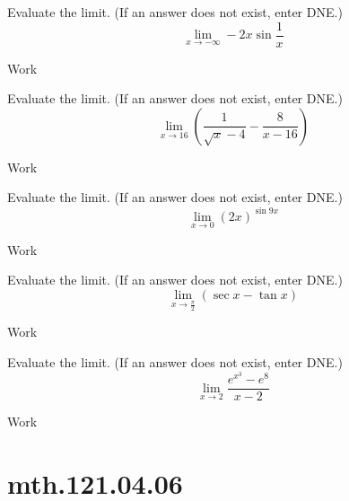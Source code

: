 \documentclass[12pt,addpoints, answers, fleqn]{exam}
\begin{document}
\begin{teacher}
\begin{questions}
\question 	%

Evaluate the limit. (If an answer does not exist, enter DNE.)
\[
\lim_{x \to - \infty} -2x \sin \frac{1}{x}
\] 
 \begin{solution}
Work
\end{solution}
 
\question 	%

Evaluate the limit. (If an answer does not exist, enter DNE.)
\[
\lim_{x \to 16} \left( \frac{1}{\sqrt{x} - 4} - \frac{8}{x-16} \right)
\]
\begin{solution}
Work
\end{solution}




\question 	%

Evaluate the limit. (If an answer does not exist, enter DNE.)
\[
\lim_{x \to 0} \left(2x\right)^{\sin 9x}
\]
\begin{solution}
Work
\end{solution}


\question 	%

Evaluate the limit. (If an answer does not exist, enter DNE.)
\[
\lim_{x \to \frac{\pi}{2}} \left( \sec x - \tan x \right)
\]
\begin{solution}
Work
\end{solution}



\question 	%

Evaluate the limit. (If an answer does not exist, enter DNE.)
\[
\lim_{x \to 2} \frac{e^{x^3}-e^8}{x-2}
\]
 \begin{solution}
Work
\end{solution}
 
 
\end{questions}

\end{teacher}
\vfill
\pagebreak









\section{mth.121.04.06}
\end{document}
